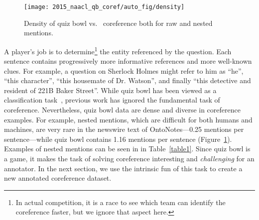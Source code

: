 \begin{figure}[t]
\begin{center}
\texttt{[image: 2015\_naacl\_qb\_coref/auto\_fig/density]}
\end{center}
   \caption{Density of quiz bowl vs.\ \conll{} coreference both for raw and nested mentions.}
\label{fig:dense}
\end{figure}

A player's job is to
determine\footnote{In actual competition, it is a race to see which
  team can identify the coreference faster, but we ignore that aspect
  here.} the entity referenced by the question.  Each sentence contains
progressively more informative references and more well-known clues.  For
example, a question on Sherlock Holmes might refer to him as ``he'',
``this character'', ``this housemate of Dr. Watson'', and finally
``this detective and resident of 221B Baker Street''. While quiz bowl has been viewed as a classification
task~\cite{IyyerQA2014}, previous work has ignored the
fundamental task of coreference.  Nevertheless, quiz bowl data are dense and
diverse in coreference examples. For example, nested mentions, which are
difficult for both humans and machines, are very rare in the newswire text of
OntoNotes---0.25 mentions per sentence---while quiz bowl contains 1.16 mentions
per sentence (Figure~\ref{fig:dense}). Examples of nested mentions can be seen in
in Table~\ref{table1}. Since quiz bowl is a game, it makes the task of solving coreference interesting
and \emph{challenging} for an annotator. In the next section, we use the
intrinsic fun of this task to create a new annotated coreference dataset.








